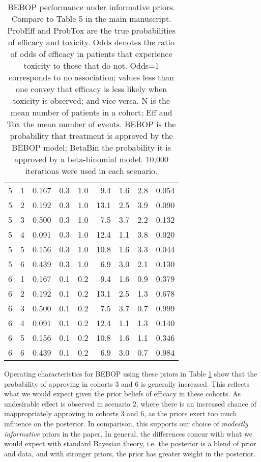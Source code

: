 \documentclass{article}
\begin{document}
\begin{table}[h!]
\begin{tabular}{rrrrrrrrr}
		\hline
		5 & 1 & 0.167 & 0.3 & 1.0 & 9.4 & 1.6 & 2.8 & 0.054 \\ 
		5 & 2 & 0.192 & 0.3 & 1.0 & 13.1 & 2.5 & 3.9 & 0.090 \\ 
		5 & 3 & 0.500 & 0.3 & 1.0 & 7.5 & 3.7 & 2.2 & 0.132 \\ 
		5 & 4 & 0.091 & 0.3 & 1.0 & 12.4 & 1.1 & 3.8 & 0.020 \\ 
		5 & 5 & 0.156 & 0.3 & 1.0 & 10.8 & 1.6 & 3.3 & 0.044 \\ 
		5 & 6 & 0.439 & 0.3 & 1.0 & 6.9 & 3.0 & 2.1 & 0.130 \\ 
		\hline
		6 & 1 & 0.167 & 0.1 & 0.2 & 9.4 & 1.6 & 0.9 & 0.379 \\ 
		6 & 2 & 0.192 & 0.1 & 0.2 & 13.1 & 2.5 & 1.3 & 0.678 \\ 
		6 & 3 & 0.500 & 0.1 & 0.2 & 7.5 & 3.7 & 0.7 & 0.999 \\ 
		6 & 4 & 0.091 & 0.1 & 0.2 & 12.4 & 1.1 & 1.3 & 0.140 \\ 
		6 & 5 & 0.156 & 0.1 & 0.2 & 10.8 & 1.6 & 1.1 & 0.346 \\ 
		6 & 6 & 0.439 & 0.1 & 0.2 & 6.9 & 3.0 & 0.7 & 0.984 \\ 
		\hline
	\end{tabular}
	\caption{BEBOP performance under informative priors. Compare to Table 5 in the main manuscript.
	ProbEff and ProbTox are the true probabilities of efficacy and toxicity.
	Odds denotes the ratio of odds of efficacy in patients that experience toxicity to those that do not.
	Odds=1 corresponds to no association; values less than one convey that efficacy is less likely when toxicity is observed; and vice-versa.
	N is the mean number of patients in a cohort; Eff and Tox the mean number of events.
	BEBOP is the probability that treatment is approved by the BEBOP model; 
	BetaBin the probability it is approved by a beta-binomial model.
	10,000 iterations were used in each scenario.} 
	\label{tab:informative_ocs}
\end{table}

Operating characteristics for BEBOP using these priors in Table \ref{tab:informative_ocs} show that the probability of approving in cohorts 3 and 6 is generally increased.
This reflects what we would expect given the prior beliefs of efficacy in these cohorts.
As undesirable effect is observed in scenario 2, where there is an increased chance of inappropriately approving in cohorts 3 and 6, as the priors exert too much influence on the posterior.
In comparison, this supports our choice of \textit{modestly informative} priors in the paper.
In general, the differences concur with what we would expect with standard Bayesian theory, i.e. the posterior is a blend of prior and data, and with stronger priors, the prior has greater weight in the posterior.
\end{document}
